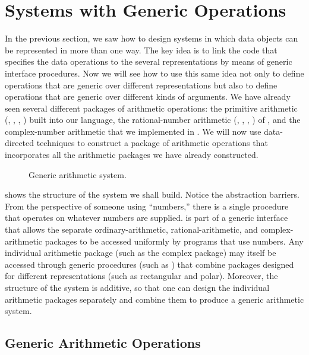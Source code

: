 \section{Systems with Generic Operations}
\label{Section 2.5}

In the previous section, we saw how to design systems in which data objects can be represented in more than one way.
The key idea is to link the code that specifies the data operations to the several representations by means of generic interface procedures.
Now we will see how to use this same idea not only to define operations that are generic over different representations but also to define operations that are generic over different kinds of arguments.
We have already seen several different packages of arithmetic operations:
the primitive arithmetic (\code{+}, \code{-}, \code{*}, \code{/}) built into our language, the rational-number arithmetic (, , , ) of , and the complex-number arithmetic that we implemented in .
We will now use data-directed techniques to construct a package of arithmetic operations that incorporates all the arithmetic packages we have already constructed.

\begin{figure}[tb]
	\centering
	
	\caption{Generic arithmetic system.}
	\label{Figure 2.23}
\end{figure}

 shows the structure of the system we shall build.
Notice the abstraction barriers.
From the perspective of someone using “numbers,” there is a single procedure  that operates on whatever numbers are supplied.
 is part of a generic interface that allows the separate ordinary-arithmetic, rational-arithmetic, and complex-arithmetic packages to be accessed uniformly by programs that use numbers.
Any individual arithmetic package (such as the complex package) may itself be accessed through generic procedures (such as ) that combine packages designed for different representations (such as rectangular and polar).
Moreover, the structure of the system is additive, so that one can design the individual arithmetic packages separately and combine them to produce a generic arithmetic system.



\subsection{Generic Arithmetic Operations}
\label{Section 2.5.1}

